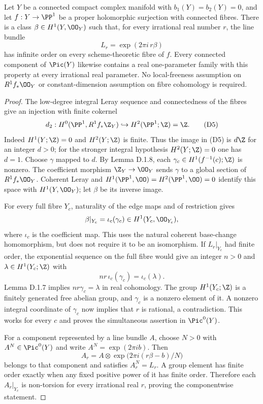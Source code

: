 \begin{proposition}[D.1.9; Proved]\label{st:D.1.9}
Let $Y$ be a connected compact complex manifold with
$b_1(Y)=b_2(Y)=0$, and let $f:Y\to\PP^1$ be a proper
holomorphic surjection with connected fibres. There is a class
$\beta\in H^1(Y,\OO_Y)$ such that, for every irrational real number
$r$, the line bundle
\[
L_r=\exp(2\pi i\,r\beta)
\]
has infinite order on every scheme-theoretic fibre of $f$.
Every connected component of $\Pic(Y)$ likewise contains a real
one-parameter family with this property at every irrational real
parameter.
No local-freeness assumption on $R^1f_*\OO_Y$ or constant-dimension
assumption on fibre cohomology is required.
\end{proposition}
\begin{proof}
The low-degree integral Leray sequence and connectedness of the
fibres give an injection with finite cokernel
\[
d_2:H^0(\PP^1,R^1f_*\Z_Y)
 \hookrightarrow H^2(\PP^1;\Z)=\Z.                   \tag{D5}
\]
Indeed $H^1(Y;\Z)=0$ and $H^2(Y;\Z)$ is finite.
Thus the image in (D5) is $d\Z$ for an integer $d>0$; for the
stronger integral hypothesis $H^2(Y;\Z)=0$ one has $d=1$.
Choose $\gamma$ mapped to $d$. By Lemma D.1.8,
each $\gamma_c\in H^1(f^{-1}(c);\Z)$ is nonzero.
The coefficient morphism $\Z_Y\to\OO_Y$ sends $\gamma$ to a
global section of $R^1f_*\OO_Y$. Coherent Leray and
$H^1(\PP^1,\OO)=H^2(\PP^1,\OO)=0$ identify this space with
$H^1(Y,\OO_Y)$; let $\beta$ be its inverse image.

For every full fibre $Y_c$, naturality of the edge maps and of
restriction gives
\[
\beta|_{Y_c}=\iota_c(\gamma_c)\in H^1(Y_c,\OO_{Y_c}), 
\]
where $\iota_c$ is the coefficient map. This uses the natural
coherent base-change homomorphism, but does not require it to be
an isomorphism. If $L_r|_{Y_c}$ had finite order, the exponential
sequence on the full fibre would give an integer $n>0$ and
$\lambda\in H^1(Y_c;\Z)$ with
\[
nr\,\iota_c(\gamma_c)=\iota_c(\lambda).
\]
Lemma D.1.7 implies $nr\gamma_c=\lambda$ in real cohomology.
The group $H^1(Y_c;\Z)$ is a finitely generated free abelian group,
and $\gamma_c$ is a nonzero element of it. A nonzero integral
coordinate of $\gamma_c$ now implies that $r$ is rational, a
contradiction. This works for every $c$ and proves the simultaneous
assertion in $\Pic^0(Y)$.

For a component represented by a line bundle $A$, choose $N>0$
with $A^N\in\Pic^0(Y)$ and write $A^N=\exp(2\pi i b)$.
Then
\[
A_r=A\otimes\exp\bigl(2\pi i(r\beta-b)/N\bigr)
\]
belongs to that component and satisfies $A_r^N=L_r$. A group
element has finite order exactly when any fixed positive power of
it has finite order. Therefore each $A_r|_{Y_c}$ is non-torsion
for every irrational real $r$, proving the componentwise statement.
\end{proof}

